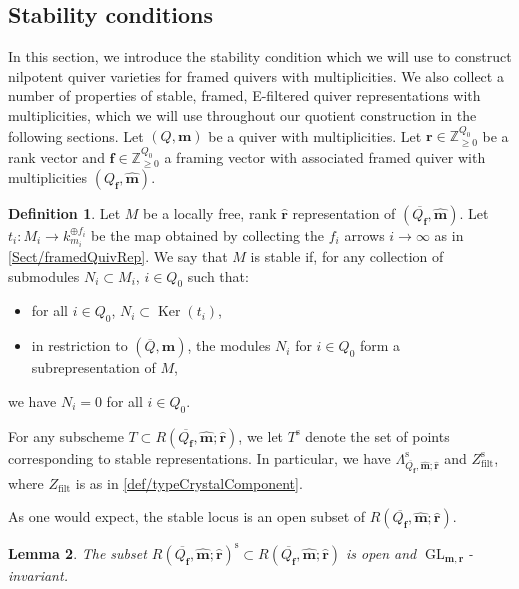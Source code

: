 \documentclass[a4paper,12pt]{article}
\theoremstyle{definition}
\newtheorem{definition}{Definition}[section]
\theoremstyle{plain}
\newtheorem{lemma}[definition]{Lemma}
\theoremstyle{remark}
\DeclareMathOperator{\Ker}{Ker}
\DeclareMathOperator{\GL}{GL}
\newcommand{\st}{\mathrm{s}}
\newcommand\bbZ{\mathbb{Z}}
\newcommand\bff{\mathbf{f}}
\newcommand\bfm{\mathbf{m}}
\newcommand\bfr{\mathbf{r}}
\begin{document}
\subsection{Stability conditions}

In this section, we introduce the stability condition which we will use to construct nilpotent quiver varieties for framed quivers with multiplicities. We also collect a number of properties of stable, framed, E-filtered quiver representations with multiplicities, which we will use throughout our quotient construction in the following sections. Let $(Q,\bfm)$ be a quiver with multiplicities. Let $\bfr\in\bbZ_{\geq0}^{Q_0}$ be a rank vector and $\bff\in\bbZ_{\geq0}^{Q_0}$ a framing vector with associated framed quiver with multiplicities $(Q_\bff,\widehat{\bfm})$. 

\begin{definition}\label{def/stable}
Let $M$ be a locally free, rank $\widehat{\bfr}$ representation of $(\overline{Q_\bff},\widehat{\bfm})$. Let $t_i:M_i\rightarrow k_{m_i}^{\oplus f_i}$ be the map obtained by collecting the $f_i$ arrows $i\rightarrow\infty$ as in \cref{Sect/framedQuivRep}. We say that $M$ is stable if, for any collection of submodules $N_i\subset M_i$, $i\in Q_0$ such that:
\begin{itemize}
\item for all $i\in Q_0$, $N_i\subset \Ker(t_i)$,
\item in restriction to $(\overline{Q},\bfm)$, the modules $N_i$ for $ i\in Q_0$ form a subrepresentation of $M$,
\end{itemize}
we have $N_i=0$ for all $i\in Q_0$. 

For any subscheme $T \subset R(\overline{Q_\bff},\widehat{\bfm};\widehat{\bfr})$, we let $T^{\st}$ denote the set of points corresponding to stable representations. In particular, we have $\Lambda_{\overline{Q_\bff},\widehat{\bfm};\widehat{\bfr}}^\st$ and $Z_{\mathrm{filt}}^\st$, where $Z_\mathrm{filt}$ is as in \cref{def/typeCrystalComponent}.
\end{definition}

As one would expect, the stable locus is an open subset of $R(\overline{Q_\bff},\widehat{\bfm};\widehat{\bfr})$.

\begin{lemma}\label{Lem/opennessStability}
The subset $R(\overline{Q_\bff},\widehat{\bfm};\widehat{\bfr})^{\st}\subset R(\overline{Q_\bff},\widehat{\bfm};\widehat{\bfr})$ is open and $\GL_{\bfm,\bfr}$-invariant.
\end{lemma}
\end{document}
